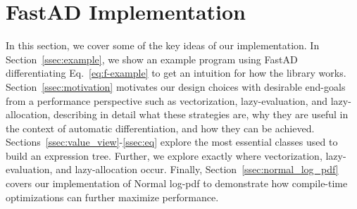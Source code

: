 \section{FastAD Implementation}\label{sec:fastad}

In this section, we cover some of the key ideas of our implementation.
In Section~\ref{ssec:example}, we show an example program using FastAD
differentiating Eq.~\ref{eq:f-example} to get an intuition for how the library works.
Section~\ref{ssec:motivation} motivates our design choices with desirable end-goals
from a performance perspective such as vectorization, lazy-evaluation, and lazy-allocation,
describing in detail what these strategies are,
why they are useful in the context of automatic differentiation,
and how they can be achieved.
Sections~\ref{ssec:value_view}-\ref{ssec:eq} explore the most essential classes
used to build an expression tree.
Further, we explore exactly where vectorization, lazy-evaluation, and lazy-allocation occur.
Finally, Section~\ref{ssec:normal_log_pdf} covers our implementation of
Normal log-pdf to demonstrate how compile-time optimizations 
can further maximize performance.






















